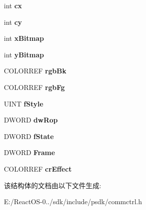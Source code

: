 \begin{DoxyCompactItemize}
int {\bfseries cx}
\item 
\mbox{\label{struct___i_m_a_g_e_l_i_s_t_d_r_a_w_p_a_r_a_m_s_a14c01b39d98fc2fd159ac89efa99b464}} 
int {\bfseries cy}
\item 
\mbox{\label{struct___i_m_a_g_e_l_i_s_t_d_r_a_w_p_a_r_a_m_s_a0f64977a26b92613cf5dfc3b29483913}} 
int {\bfseries x\+Bitmap}
\item 
\mbox{\label{struct___i_m_a_g_e_l_i_s_t_d_r_a_w_p_a_r_a_m_s_aa7832e1125ced43b7031db0df717c9fc}} 
int {\bfseries y\+Bitmap}
\item 
\mbox{\label{struct___i_m_a_g_e_l_i_s_t_d_r_a_w_p_a_r_a_m_s_a68672369ef6a53aa1702b74b7aed8845}} 
C\+O\+L\+O\+R\+R\+EF {\bfseries rgb\+Bk}
\item 
\mbox{\label{struct___i_m_a_g_e_l_i_s_t_d_r_a_w_p_a_r_a_m_s_a37af972968264531aae29b5709b1f7c6}} 
C\+O\+L\+O\+R\+R\+EF {\bfseries rgb\+Fg}
\item 
\mbox{\label{struct___i_m_a_g_e_l_i_s_t_d_r_a_w_p_a_r_a_m_s_ab64da2171c5f68c492e94337c0c5324e}} 
U\+I\+NT {\bfseries f\+Style}
\item 
\mbox{\label{struct___i_m_a_g_e_l_i_s_t_d_r_a_w_p_a_r_a_m_s_ac4c786867e0ad567c72a9308b4e713fa}} 
D\+W\+O\+RD {\bfseries dw\+Rop}
\item 
\mbox{\label{struct___i_m_a_g_e_l_i_s_t_d_r_a_w_p_a_r_a_m_s_ac12707a12e296f967c8926b2df4f9f51}} 
D\+W\+O\+RD {\bfseries f\+State}
\item 
\mbox{\label{struct___i_m_a_g_e_l_i_s_t_d_r_a_w_p_a_r_a_m_s_a857cf819fe47ec1fbcd8a2402d129359}} 
D\+W\+O\+RD {\bfseries Frame}
\item 
\mbox{\label{struct___i_m_a_g_e_l_i_s_t_d_r_a_w_p_a_r_a_m_s_aff7db9c54501d164857c43fc1fd3e124}} 
C\+O\+L\+O\+R\+R\+EF {\bfseries cr\+Effect}
\end{DoxyCompactItemize}


该结构体的文档由以下文件生成\+:\begin{DoxyCompactItemize}
\item 
E\+:/\+React\+O\+S-\/0../sdk/include/psdk/commctrl.\+h\end{DoxyCompactItemize}
